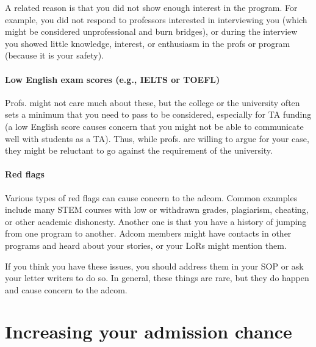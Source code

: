 \documentclass[oneside,11pt,dvipsnames]{book}
\newcommand{\subsectioninfo}[1]{%
  \phantomsection
  \addcontentsline{toc}{subsectioninfo}{\textcolor{black}{\texttt #1}}%
}
\begin{document}
A related reason is that you did not show enough interest in the program.
For example, you did not respond to professors interested in interviewing you (which might be considered unprofessional and burn bridges), or during the interview you showed little knowledge, interest, or enthusiasm in the profs or program (because it is your safety). 

\paragraph{Low English exam scores (e.g., IELTS or TOEFL)}  Profs. might not care much about these, but the college or the university often sets a minimum that you need to pass to be considered, especially for TA funding (a low English score causes concern that you might not be able to communicate well with students as a TA).  Thus, while profs. are willing to argue for your case, they might be reluctant to go against the requirement of the university.




\paragraph{Red flags} Various types of red flags can cause concern to the adcom. Common examples include many STEM courses with low or withdrawn grades, plagiarism, cheating, or other academic dishonesty. Another one is that you have a history of jumping from one program to another. Adcom members might have contacts in other programs and heard about your stories, or your LoRs might mention them.

If you think you have these issues, you should address them in your SOP or ask your letter writers to do so.
In general, these things are rare, but they do happen and cause concern to the adcom.



\section{Increasing your admission chance}\label{sec:improve-your-chance}
\subsectioninfo{You can improve your profile by being unique and standing out.}
\end{document}
